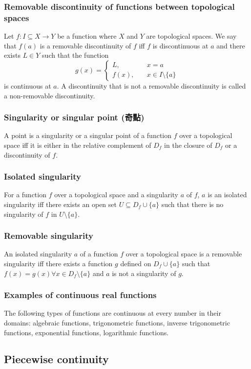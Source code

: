 \begin{itemize}
\begin{itemize}
\subsubsection{Removable discontinuity of functions between topological spaces}
Let $f\colon I\subseteq X\to Y$ be a function where $X$ and $Y$ are topological spaces. We say that $f(a)$ is a removable discontinuity of $f$ iff $f$ is discontinuous at $a$ and there exists $L\in Y$ such that the function
\[g(x)=\begin{cases}L,\quad&x=a\\f(x),\quad&x\in I\setminus\{a\}\end{cases}\]
is continuous at $a$. A discontinuity that is not a removable discontinuity is called a non-removable discontinuity.
\subsubsection{Singularity or singular point (奇點)}
A point is a singularity or a singular point of a function $f$ over a topological space iff it is either in the relative complement of $D_f$ in the closure of $D_f$ or a discontinuity of $f$.
\subsubsection{Isolated singularity}
For a function $f$ over a topological space and a singularity $a$ of $f$, $a$ is an isolated singularity iff there exists an open set $U\subseteq D_f\cup\{a\}$ such that there is no singularity of $f$ in $U\setminus\{a\}$.
\subsubsection{Removable singularity}
An isolated singularity $a$ of a function $f$ over a topological space is a removable singularity iff there exists a function $g$ defined on $D_f\cup\{a\}$ such that $f(x)=g(x)\forall x\in D_f\setminus\{a\}$ and $a$ is not a singularity of $g$.
\subsubsection{Examples of continuous real functions}
The following types of functions are continuous at every number in their domains: algebraic functions, trigonometric functions, inverse trigonometric functions, exponential functions, logarithmic functions.
\subsection{Piecewise continuity}

\end{itemize}
\end{itemize}
